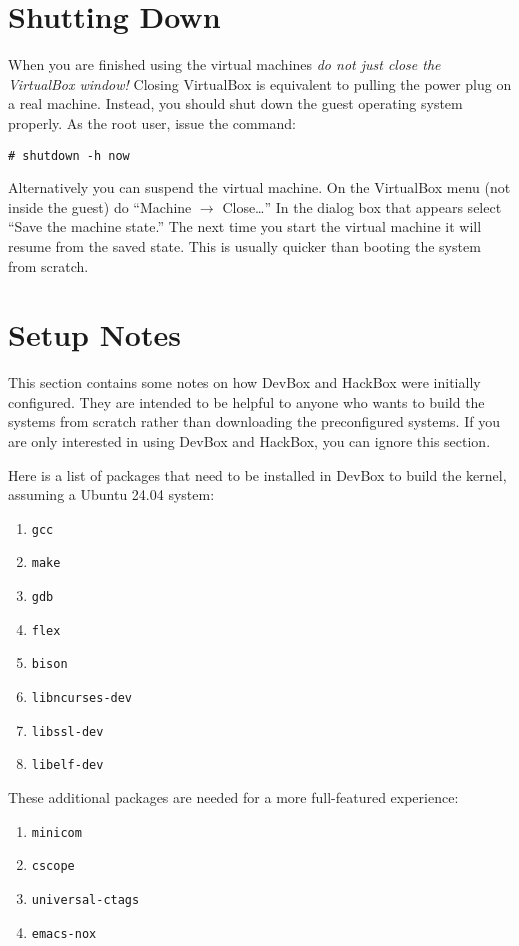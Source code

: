 \documentclass{article}
\begin{document}
\section{Shutting Down}

When you are finished using the virtual machines \emph{do not just close the VirtualBox window!}
Closing VirtualBox is equivalent to pulling the power plug on a real machine. Instead, you
should shut down the guest operating system properly. As the root user, issue the command:
\begin{Verbatim}
# shutdown -h now
\end{Verbatim}

Alternatively you can suspend the virtual machine. On the VirtualBox menu (not inside the guest)
do ``Machine $\rightarrow$ Close\ldots'' In the dialog box that appears select ``Save the
machine state.'' The next time you start the virtual machine it will resume from the saved
state. This is usually quicker than booting the system from scratch.

\section{Setup Notes}

This section contains some notes on how DevBox and HackBox were initially configured. They are
intended to be helpful to anyone who wants to build the systems from scratch rather than
downloading the preconfigured systems. If you are only interested in using DevBox and HackBox,
you can ignore this section.

Here is a list of packages that need to be installed in DevBox to build the kernel, assuming a
Ubuntu 24.04 system:
\begin{enumerate}
  \item \texttt{gcc}
  \item \texttt{make}
  \item \texttt{gdb}
  \item \texttt{flex}
  \item \texttt{bison}
  \item \texttt{libncurses-dev}
  \item \texttt{libssl-dev}
  \item \texttt{libelf-dev}
\end{enumerate}

These additional packages are needed for a more full-featured experience:
\begin{enumerate}
  \item \texttt{minicom}
  \item \texttt{cscope}
  \item \texttt{universal-ctags}
  \item \texttt{emacs-nox}
\end{enumerate}
\end{document}
